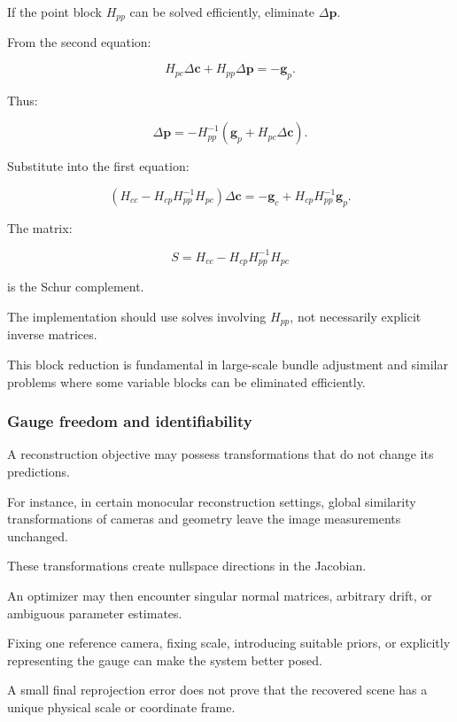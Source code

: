 If the point block \(H_{pp}\) can be solved efficiently, eliminate \(\Delta\mathbf p\).

From the second equation:

\[
H_{pc}\Delta\mathbf c+ H_{pp}\Delta\mathbf p=-\mathbf g_p.
\]

Thus:

\[
\Delta\mathbf p= -H_{pp}^{-1} (\mathbf g_p+H_{pc}\Delta\mathbf c).
\]

Substitute into the first equation:

\[
\boxed{ \left( H_{cc}-H_{cp}H_{pp}^{-1}H_{pc} \right) \Delta\mathbf c = -\mathbf g_c+ H_{cp}H_{pp}^{-1}\mathbf g_p }.
\]

The matrix:

\[
\boxed{ S=H_{cc}-H_{cp}H_{pp}^{-1}H_{pc} }
\]

is the Schur complement.

The implementation should use solves involving \(H_{pp}\), not necessarily explicit inverse matrices.

This block reduction is fundamental in large-scale bundle adjustment and similar problems where some variable blocks can be eliminated efficiently.

\subsubsection{Gauge freedom and identifiability}\label{02-foundations-ii-ch028-gauge-freedom-and-identifiability}

\hypertarget{02-foundations-ii-ch028-gauge-freedom-and-identifiability}{}

A reconstruction objective may possess transformations that do not change its predictions.

For instance, in certain monocular reconstruction settings, global similarity transformations of cameras and geometry leave the image measurements unchanged.

These transformations create nullspace directions in the Jacobian.

An optimizer may then encounter singular normal matrices, arbitrary drift, or ambiguous parameter estimates.

Fixing one reference camera, fixing scale, introducing suitable priors, or explicitly representing the gauge can make the system better posed.

A small final reprojection error does not prove that the recovered scene has a unique physical scale or coordinate frame.

